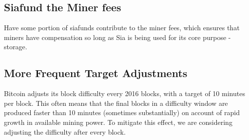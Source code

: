 \documentclass[twocolumn]{article}
\begin{document}

\subsection{Siafund the Miner fees}
Have some portion of siafunds contribute to the miner fees, which ensures that miners have compensation so long as Sia is being used for its core purpose - storage.



\subsection{More Frequent Target Adjustments}
Bitcoin adjusts its block difficulty every 2016 blocks, with a target of 10 minutes per block.
This often means that the final blocks in a difficulty window are produced faster than 10 minutes (sometimes substantially) on account of rapid growth in available mining power.
To mitigate this effect, we are considering adjusting the difficulty after every block.
\end{document}
